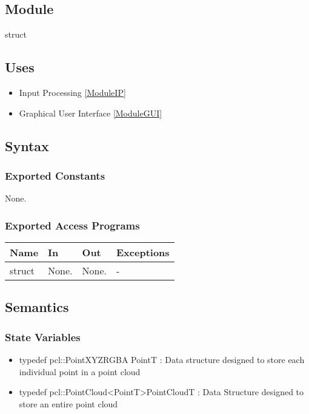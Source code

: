 \documentclass[12pt, titlepage]{article}
\begin{document}
\subsection{Module}

struct

\subsection{Uses}

\begin{itemize}
  \item Input Processing \ref{ModuleIP}
  \item Graphical User Interface \ref{ModuleGUI}
\end{itemize}

\subsection{Syntax}

\subsubsection{Exported Constants}

None.

\subsubsection{Exported Access Programs}

\begin{center}
\begin{tabular}{p{3cm} p{4cm} p{4cm} p{2cm}}
\hline
\textbf{Name} & \textbf{In} & \textbf{Out} & \textbf{Exceptions} \\
\hline
struct & None. & None. & - \\
\hline
\end{tabular}
\end{center}

\subsection{Semantics}

\subsubsection{State Variables}

\begin{itemize}
\item typedef pcl::PointXYZRGBA PointT : Data structure designed to store each individual point in a point cloud 
\item typedef pcl::PointCloud\textless PointT\textgreater PointCloudT : Data Structure designed to store an entire point cloud
\end{itemize}
\end{document}
